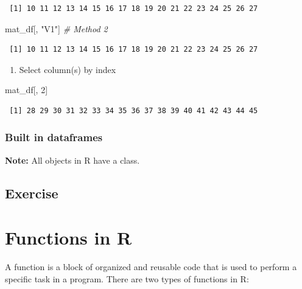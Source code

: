 \documentclass[]{book}
\newenvironment{Shaded}{\begin{snugshade}}{\end{snugshade}}
\newcommand{\CommentTok}[1]{\textcolor[rgb]{0.56,0.35,0.01}{\textit{#1}}}
\newcommand{\DecValTok}[1]{\textcolor[rgb]{0.00,0.00,0.81}{#1}}
\newcommand{\NormalTok}[1]{#1}
\newcommand{\StringTok}[1]{\textcolor[rgb]{0.31,0.60,0.02}{#1}}
\providecommand{\tightlist}{%
  \setlength{\itemsep}{0pt}\setlength{\parskip}{0pt}}
\begin{document}
\begin{verbatim}
 [1] 10 11 12 13 14 15 16 17 18 19 20 21 22 23 24 25 26 27
\end{verbatim}

\begin{Shaded}
\begin{Highlighting}[]
\NormalTok{mat_df[, }\StringTok{"V1"}\NormalTok{] }\CommentTok{# Method 2}
\end{Highlighting}
\end{Shaded}

\begin{verbatim}
 [1] 10 11 12 13 14 15 16 17 18 19 20 21 22 23 24 25 26 27
\end{verbatim}

\begin{enumerate}
\def\labelenumi{\arabic{enumi}.}
\setcounter{enumi}{1}
\tightlist
\item
  Select column(s) by index
\end{enumerate}

\begin{Shaded}
\begin{Highlighting}[]
\NormalTok{mat_df[, }\DecValTok{2}\NormalTok{]}
\end{Highlighting}
\end{Shaded}

\begin{verbatim}
 [1] 28 29 30 31 32 33 34 35 36 37 38 39 40 41 42 43 44 45
\end{verbatim}

\hypertarget{built-in-dataframes}{%
\subsection{Built in dataframes}\label{built-in-dataframes}}

\textbf{Note:} All objects in R have a class.

\hypertarget{exercise}{%
\section{Exercise}\label{exercise}}

\hypertarget{function}{%
\chapter{Functions in R}\label{function}}

A function is a block of organized and reusable code that is used to perform a specific task in a program. There are two types of functions in R:
\end{document}
